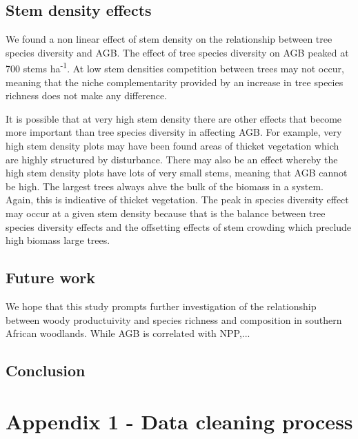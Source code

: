 \documentclass[11pt,a4paper]{article}
\begin{document}
\subsection{Stem density effects}

We found a non linear effect of stem density on the relationship between tree species diversity and AGB. The effect of tree species diversity on AGB peaked at \textapprox{}700 stems ha\textsuperscript{-1}. At low stem densities competition between trees may not occur, meaning that the niche complementarity provided by an increase in tree species richness does not make any difference. 

It is possible that at very high stem density there are other effects that become more important than tree species diversity in affecting AGB. For example, very high stem density plots may have been found areas of thicket vegetation which are highly structured by disturbance. There may also be an effect whereby the high stem density plots have lots of very small stems, meaning that AGB cannot be high. The largest trees always ahve the bulk of the biomass in a system. Again, this is indicative of thicket vegetation. The peak in species diversity effect may occur at a given stem density because that is the balance between tree species diversity effects and the offsetting effects of stem crowding which preclude high biomass large trees.


\subsection{Future work}

We hope that this study prompts further investigation of the relationship between woody productuivity and species richness and composition in southern African woodlands. While AGB is correlated with NPP,...

\subsection{Conclusion}



\newpage{}
\appendix{}

\section*{Appendix 1 - Data cleaning process}
\end{document}
